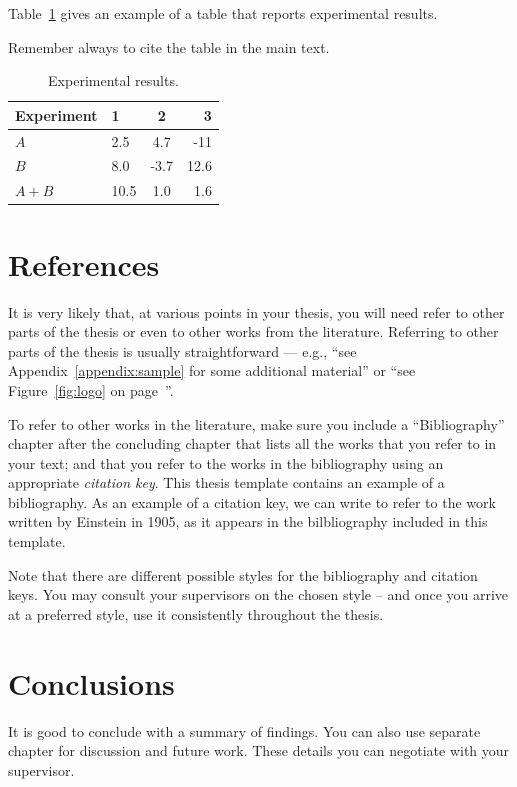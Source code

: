 Table~\ref{table:results} gives an example of a table that reports experimental results.

Remember always to cite the table in the main text. 

\begin{table}[t!]
\begin{center}
\caption{Experimental results.\label{table:results}}
\begin{tabular}{l||l c r} 
Experiment & 1 & 2 & 3 \\ 
\hline \hline 
$A$ & 2.5 & 4.7 & -11 \\
$B$ & 8.0 & -3.7 & 12.6 \\
$A+B$ & 10.5 & 1.0 & 1.6 \\
\hline
%
\end{tabular}
\end{center}
\end{table}

\chapter{References}

It is very likely that, at various points in your thesis, you will need refer to other parts of the thesis or even to other works from the literature.
%
Referring to other parts of the thesis is usually straightforward --- e.g., ``see
Appendix~\ref{appendix:sample} for some additional material'' or ``see Figure~\ref{fig:logo} on page~\pageref{fig:logo}''.

To refer to other works in the literature, make sure you include a ``Bibliography'' chapter after the concluding chapter that lists all the works that you refer to in your text; and that you refer to the works in the bibliography using an appropriate \emph{citation key}.
%
This thesis template contains an example of a bibliography.
%
As an example of a citation key, we can write \citep{einstein} to refer to the work written by Einstein in 1905, as it appears in the bilbliography included in this template.

Note that there are different possible styles for the bibliography and citation keys.
%
You may consult your supervisors on the chosen style -- and once you arrive at a preferred style, use it consistently throughout the thesis.
 
\chapter{Conclusions\label{chapter:conclusions}}

It is good to conclude with a summary of findings. You can also use separate chapter for discussion and future work. These details you can negotiate with your supervisor.
